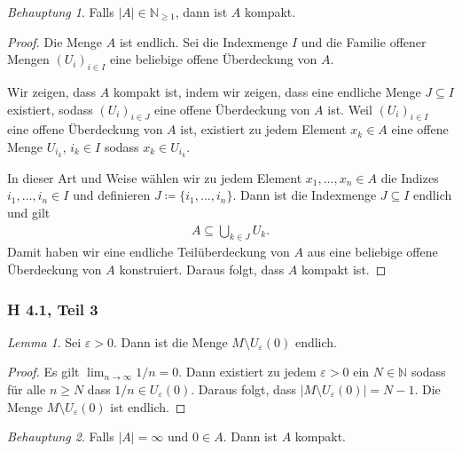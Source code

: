 \documentclass[draft,a5paper]{article}
\theoremstyle{remark}
\newtheorem*{beh}{Behauptung}
\newtheorem*{lem}{Lemma}
\newcommand{\envert}[1]{\left\lvert#1\right\rvert}
\begin{document}
\begin{beh}
  Falls \(\envert{A} \in \mathbb{N}_{\ge 1}\), dann ist \(A\) kompakt.
\end{beh}

\begin{proof}
  Die Menge \(A\) ist endlich. Sei die Indexmenge \(I\) und die
  Familie offener Mengen \((U_{i})_{i \in I}\) eine beliebige offene
  Überdeckung von \(A\).

  Wir zeigen, dass \(A\) kompakt ist, indem
  wir zeigen, dass eine endliche Menge \(J \subseteq I\) existiert, sodass
  \((U_{i})_{i \in J}\) eine offene Überdeckung von \(A\) ist.  Weil
  \((U_{i})_{i \in I}\) eine offene Überdeckung von \(A\) ist, existiert
  zu jedem Element \(x_{k} \in A\) eine offene Menge \(U_{i_{k}}\),
  \(i_{k} \in I\) sodass \(x_{k} \in U_{i_{k}}\).

  In dieser Art und Weise wählen wir zu jedem Element
  \(x_{1}, \ldots, x_{n} \in A\) die Indizes
  \(i_{1}, \ldots, i_{n} \in I\) und definieren
  \(J \coloneq \{i_{1}, \ldots, i_{n}\}\).  Dann ist die Indexmenge
  \(J \subseteq I\) endlich und gilt
  \begin{align*}
    A \subseteq \bigcup_{k \in J}{U_{k}}.
  \end{align*}
  Damit haben wir eine endliche Teilüberdeckung von
  \(A\) aus eine beliebige offene Überdeckung von \(A\)
  konstruiert. Daraus folgt, dass \(A\) kompakt ist.
\end{proof}

\subsubsection*{H 4.1, Teil 3}

\begin{lem}
  Sei \(\varepsilon > 0\).  Dann ist die Menge \(M \setminus U_{\varepsilon}(0)\) endlich.
\end{lem}

\begin{proof}
  Es gilt \(\lim_{n \to \infty}{1/n} = 0\).  Dann existiert zu jedem
  \(\varepsilon > 0\) ein \(N \in \mathbb{N}\) sodass für alle
  \(n \ge N\) dass \(1/n \in U_{\varepsilon}(0)\).  Daraus folgt, dass \(\envert{M \setminus
    U_{\varepsilon}(0)} = N - 1\).  Die Menge \(M \setminus U_{\varepsilon}(0)\) ist endlich.
\end{proof}

\begin{beh}
  Falls \(\envert{A} = \infty\) und \(0 \in A\).  Dann ist \(A\) kompakt.
\end{beh}
\end{document}
